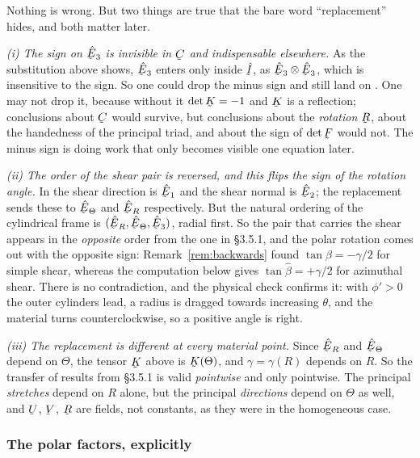 \begin{remark}
\label{rem:replacecaveats}
Nothing is wrong. But two things are true that the bare word
``replacement'' hides, and both matter later.

\emph{(i) The sign on $\hbE_{3}$ is invisible in $\bC$ and indispensable
elsewhere.} As the substitution above shows, $\hbE_{3}$ enters 
only inside $\hI$, as $\hbE_{3}\otimes\hbE_{3}$, which is insensitive to
the sign. So one could drop the minus sign and still land on .
One may not drop it, because without it $\det\bK=-1$ and $\bK$ is a
reflection; conclusions about $\bC$ would survive, but conclusions about
the \emph{rotation} $\bR$, about the handedness of the principal triad,
and about the sign of $\det\bF$ would not. The minus sign is doing work
that only becomes visible one equation later.

\emph{(ii) The order of the shear pair is reversed, and this flips the
sign of the rotation angle.} In  the shear direction is
$\hbE_{1}$ and the shear normal is $\hbE_{2}$; the replacement sends
these to $\hETh$ and $\hER$ respectively. But the natural ordering of the
cylindrical frame is $(\hER,\hETh,\hbE_{3})$, radial first. So the pair
that carries the shear appears in the \emph{opposite} order from the one
in \S3.5.1, and the polar rotation comes out with the opposite sign:
Remark~\ref{rem:backwards} found $\tan\beta=-\gamma/2$ for simple shear,
whereas the computation below gives $\tan\hat\beta=+\gamma/2$ for
azimuthal shear. There is no contradiction, and the physical check
confirms it: with $\phi'>0$ the outer cylinders lead, a radius is dragged
towards increasing $\theta$, and the material turns counterclockwise, so a
positive angle is right.

\emph{(iii) The replacement is different at every material point.} Since
$\hER$ and $\hETh$ depend on $\Theta$, the tensor $\bK$ above is
$\bK(\Theta)$, and $\gamma=\gamma(R)$ depends on $R$. So the transfer of
results from \S3.5.1 is valid \emph{pointwise} and only pointwise. The
principal \emph{stretches} depend on $R$ alone, but the principal
\emph{directions} depend on $\Theta$ as well, and $\bU$, $\bV$, $\bR$ are
fields, not constants, as they were in the homogeneous case.
\end{remark}

\subsubsection*{The polar factors, explicitly}

